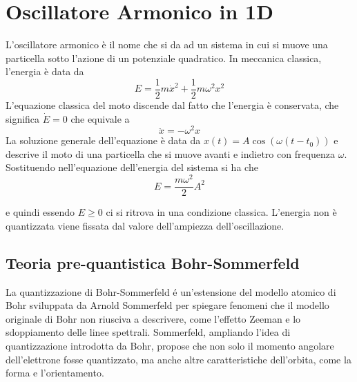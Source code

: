 \section{Oscillatore Armonico in 1D}

L'oscillatore armonico \`e il nome che si da ad un sistema in cui si muove una particella sotto l'azione di un potenziale quadratico. In meccanica classica, l'energia \`e data da 
\begin{equation*}
	E = \frac{1}{2}m \dot{x}^2 + \frac{1}{2}m\omega^2x^2
\end{equation*}
L'equazione classica del moto discende dal fatto che l'energia \`e conservata, che significa $\dot{E} = 0$ che equivale a 
\begin{equation*}
	\ddot{x} = - \omega^2x
\end{equation*}
La soluzione generale dell'equazione \`e data da $x(t) = A\cos(\omega(t-t_0))$ e descrive il moto di una particella che si muove avanti e indietro con frequenza $\omega$. Sostituendo nell'equazione dell'energia del sistema si ha che 
\begin{equation*}
	E = \frac{m\omega^2}{2}A^2
\end{equation*}

e quindi essendo $E \geq 0$ ci si ritrova in una condizione classica. L'energia non \`e quantizzata viene fissata dal valore dell'ampiezza dell'oscillazione.

\subsection{Teoria pre-quantistica Bohr-Sommerfeld}

La quantizzazione di Bohr-Sommerfeld \'e un'estensione del modello atomico di Bohr sviluppata da Arnold Sommerfeld per spiegare fenomeni che il modello originale di Bohr non riusciva a descrivere, come l’effetto Zeeman e lo sdoppiamento delle linee spettrali. Sommerfeld, ampliando l’idea di quantizzazione introdotta da Bohr, propose che non solo il momento angolare dell’elettrone fosse quantizzato, ma anche altre caratteristiche dell’orbita, come la forma e l’orientamento.
\newline

